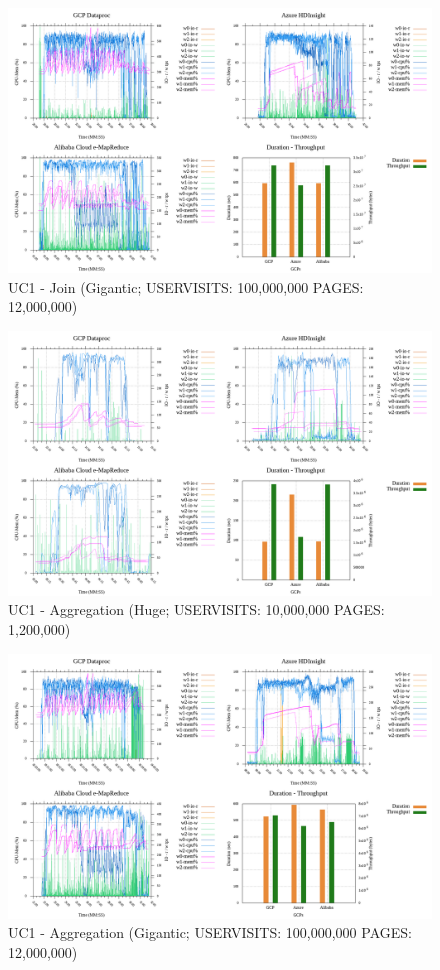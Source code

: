 \documentclass[review]{elsarticle}
\begin{document}
\begin{figure}[p]
	\caption{UC1 - Join (Gigantic; USERVISITS: 100,000,000 PAGES: 12,000,000)}
	\label{fig:uc1-join-g-cmidt}
	\includegraphics[width=\textwidth]{uc1-join-g-cmidt}
	\centering
\end{figure}

\begin{figure}[p]
	\caption{UC1 - Aggregation (Huge; USERVISITS: 10,000,000 PAGES: 1,200,000)}
	\label{fig:uc1-aggreg-h-cmidt}
	\includegraphics[width=\textwidth]{uc1-aggreg-h-cmidt}
	\centering
\end{figure}

\begin{figure}[p]
	\caption{UC1 - Aggregation (Gigantic; USERVISITS: 100,000,000 PAGES: 12,000,000)}
	\label{fig:uc1-aggreg-g-cmidt}
	\includegraphics[width=\textwidth]{uc1-aggreg-g-cmidt}
	\centering
\end{figure}
\end{document}
